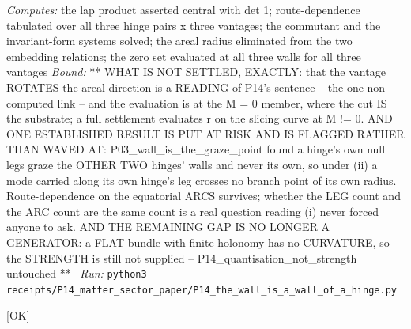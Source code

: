 \begin{description}
\emph{Computes:} the lap product asserted central with det 1; route-dependence tabulated over all three hinge pairs x three vantages; the commutant and the invariant-form systems solved; the areal radius eliminated from the two embedding relations; the zero set evaluated at all three walls for all three vantages
 \emph{Bound:} ** WHAT IS NOT SETTLED, EXACTLY: that the vantage ROTATES the areal direction is a READING of P14's sentence -- the one non-computed link -- and the evaluation is at the M = 0 member, where the cut IS the substrate; a full settlement evaluates r on the slicing curve at M != 0. AND ONE ESTABLISHED RESULT IS PUT AT RISK AND IS FLAGGED RATHER THAN WAVED AT: P03\_wall\_is\_the\_graze\_point found a hinge's own null legs graze the OTHER TWO hinges' walls and never its own, so under (ii) a mode carried along its own hinge's leg crosses no branch point of its own radius. Route-dependence on the equatorial ARCS survives; whether the LEG count and the ARC count are the same count is a real question reading (i) never forced anyone to ask. AND THE REMAINING GAP IS NO LONGER A GENERATOR: a FLAT bundle with finite holonomy has no CURVATURE, so the STRENGTH is still not supplied -- P14\_quantisation\_not\_strength untouched **
\ \emph{Run:} \texttt{python3 receipts/P14\_matter\_sector\_paper/P14\_the\_wall\_is\_a\_wall\_of\_a\_hinge.py}
\item[\label{rcpt:P14_leg_count_equals_arc_count}\texttt{P14\_leg\_count\_equals\_arc\_count}]\hfill\textsf{[OK]}\\

\end{description}
